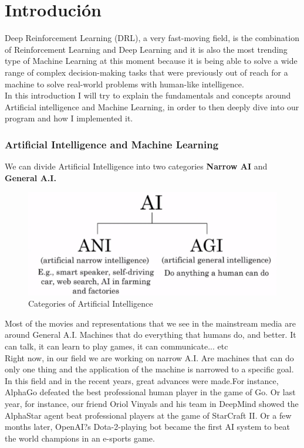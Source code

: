 \chapter{Introdución}
\label{chap:introducion}


Deep Reinforcement Learning (DRL), a very fast-moving field, is the combination of Reinforcement Learning and Deep Learning and it is also the most trending type of Machine Learning at this moment because it is being able to solve a wide range of complex decision-making tasks that were previously out of reach for a machine to solve real-world problems with human-like intelligence.\\
In this introduction I will try to explain the fundamentals and concepts around Artificial intelligence and Machine Learning, in order to then deeply dive into our program and how I implemented it.\\
\subsection{Artificial Intelligence and Machine Learning}
We can divide Artificial Intelligence into two categories \textbf{Narrow AI} and \textbf{General A.I.}

\begin{figure}[htbp]
	\centering
	\includegraphics[scale=0.25]{imaxes/cattegories_AI.png}
	\caption{Categories of Artificial Intelligence}
	\label{categoriesAI}
\end{figure}

Most of the movies and representations that we see in the mainstream media are around General A.I. Machines that do everything that humans do, and better. It can talk, it can learn to play games, it can communicate... etc \\
Right now, in our field we are working on narrow A.I. Are machines that can do only one thing and the application of the machine is narrowed to a specific goal. In this field and in the recent years, great advances were made.For instance, AlphaGo defeated the best professional human player in the game of Go. Or last year, for instance, our friend Oriol Vinyals and his team in DeepMind showed the AlphaStar agent beat professional players at the game of StarCraft II. Or a few months later, OpenAI?s Dota-2-playing bot became the first AI system to beat the world champions in an e-sports game.\\


